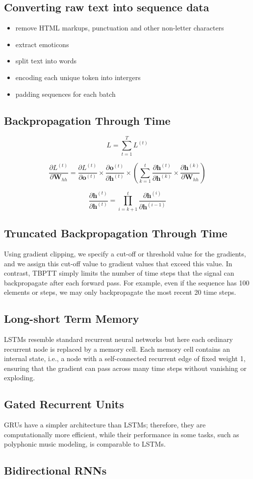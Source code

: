 \subsection{Converting raw text into sequence data}
\begin{itemize}
    \item remove HTML markups, punctuation and other non-letter characters
    \item extract emoticons
    \item split text into words
    \item encoding each unique token into intergers
    \item padding sequences for each batch
\end{itemize}


\subsection{Backpropagation Through Time}
\[L = \sum_{t=1}^T L^{(t)}\]

\[\frac{\partial L^{(t)}}{\partial \bm{W}_{hh}} = \frac{\partial L^{(t)}}{\partial \bm{o}^{(t)}} \times \frac{\partial \bm{o}^{(t)}}{\partial \bm{h}^{(t)}} \times (\sum_{k=1}^{t} \frac{\partial \bm{h}^{(t)}}{\partial \bm{h}^{(k)}} \times \frac{\partial \bm{h}^{(k)}}{\partial \bm{W}_{hh}})\]

\[\frac{\partial \bm{h}^{(t)}}{\partial \bm{h}^{(t)}} = \prod_{i=k+1}^{t} \frac{\partial \bm{h}^{(i)}}{\partial \bm{h}^{(i-1)}}\]

\subsection{Truncated Backpropagation Through Time}
Using gradient clipping, we specify a cut-off or threshold value for the gradients, and we assign this cut-off value to gradient values that exceed this value. In contrast, TBPTT simply limits the number of time steps that the signal can backpropagate after each forward pass. For example, even if the sequence has 100 elements or steps, we may only backpropagate the most recent 20 time steps.

\subsection{Long-short Term Memory}
LSTMs resemble standard recurrent neural networks but here each ordinary recurrent node is replaced by a memory cell. Each memory cell contains an internal state, i.e., a node with a self-connected recurrent edge of fixed weight 1, ensuring that the gradient can pass across many time steps without vanishing or exploding.

\subsection{Gated Recurrent Units}
GRUs have a simpler architecture than LSTMs; therefore, they are computationally more efficient, while their performance in some tasks, such as polyphonic music modeling, is comparable to LSTMs.

\subsection{Bidirectional RNNs}
